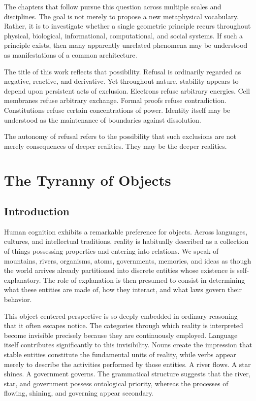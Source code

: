 \documentclass[11pt,oneside]{book}
\theoremstyle{plain}
\theoremstyle{definition}
\theoremstyle{remark}
\begin{document}
The chapters that follow pursue this question across multiple scales and disciplines. The goal is not merely to propose a new metaphysical vocabulary. Rather, it is to investigate whether a single geometric principle recurs throughout physical, biological, informational, computational, and social systems. If such a principle exists, then many apparently unrelated phenomena may be understood as manifestations of a common architecture.

The title of this work reflects that possibility. Refusal is ordinarily regarded as negative, reactive, and derivative. Yet throughout nature, stability appears to depend upon persistent acts of exclusion. Electrons refuse arbitrary energies. Cell membranes refuse arbitrary exchange. Formal proofs refuse contradiction. Constitutions refuse certain concentrations of power. Identity itself may be understood as the maintenance of boundaries against dissolution.

The autonomy of refusal refers to the possibility that such exclusions are not merely consequences of deeper realities. They may be the deeper realities.

\mainmatter

\chapter{The Tyranny of Objects}

\section{Introduction}

Human cognition exhibits a remarkable preference for objects. Across languages, cultures, and intellectual traditions, reality is habitually described as a collection of things possessing properties and entering into relations. We speak of mountains, rivers, organisms, atoms, governments, memories, and ideas as though the world arrives already partitioned into discrete entities whose existence is self-explanatory. The role of explanation is then presumed to consist in determining what these entities are made of, how they interact, and what laws govern their behavior.

This object-centered perspective is so deeply embedded in ordinary reasoning that it often escapes notice. The categories through which reality is interpreted become invisible precisely because they are continuously employed. Language itself contributes significantly to this invisibility. Nouns create the impression that stable entities constitute the fundamental units of reality, while verbs appear merely to describe the activities performed by those entities. A river flows. A star shines. A government governs. The grammatical structure suggests that the river, star, and government possess ontological priority, whereas the processes of flowing, shining, and governing appear secondary.
\end{document}
